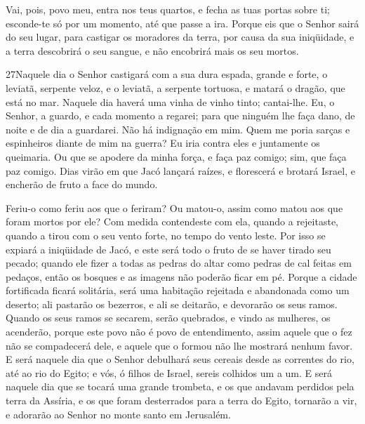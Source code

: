 Vai, pois, povo meu, entra nos teus quartos, e fecha as tuas
portas sobre ti; esconde-te só por um momento, até que passe a ira.
Porque eis que o Senhor sairá do seu lugar, para castigar os
moradores da terra, por causa da sua iniqüidade, e a terra
descobrirá o seu sangue, e não encobrirá mais os seu mortos.

\medskip

\lettrine{27}{}Naquele dia o Senhor castigará com a sua dura
espada, grande e forte, o leviatã, serpente veloz, e o leviatã, a
serpente tortuosa, e matará o dragão, que está no mar. Naquele
dia haverá uma vinha de vinho tinto; cantai-lhe. Eu, o Senhor, a
guardo, e cada momento a regarei; para que ninguém lhe faça dano, de
noite e de dia a guardarei. Não há indignação em mim. Quem me
poria sarças e espinheiros diante de mim na guerra? Eu iria contra
eles e juntamente os queimaria. Ou que se apodere da minha
força, e faça paz comigo; sim, que faça paz comigo. Dias virão
em que Jacó lançará raízes, e florescerá e brotará Israel, e
encherão de fruto a face do mundo.

Feriu-o como feriu aos que o feriram? Ou matou-o, assim como matou
aos que foram mortos por ele? Com medida contendeste com ela,
quando a rejeitaste, quando a tirou com o seu vento forte, no tempo
do vento leste. Por isso se expiará a iniqüidade de Jacó, e este
será todo o fruto de se haver tirado seu pecado; quando ele fizer a
todas as pedras do altar como pedras de cal feitas em pedaços, então
os bosques e as imagens não poderão ficar em pé. Porque a
cidade fortificada ficará solitária, será uma habitação rejeitada e
abandonada como um deserto; ali pastarão os bezerros, e ali se
deitarão, e devorarão os seus ramos. Quando os seus ramos se
secarem, serão quebrados, e vindo as mulheres, os acenderão, porque
este povo não é povo de entendimento, assim aquele que o fez não se
compadecerá dele, e aquele que o formou não lhe mostrará nenhum
favor. E será naquele dia que o Senhor debulhará seus cereais
desde as correntes do rio, até ao rio do Egito; e vós, ó filhos de
Israel, sereis colhidos um a um. E será naquele dia que se
tocará uma grande trombeta, e os que andavam perdidos pela terra da
Assíria, e os que foram desterrados para a terra do Egito, tornarão
a vir, e adorarão ao Senhor no monte santo em Jerusalém.

\medskip

